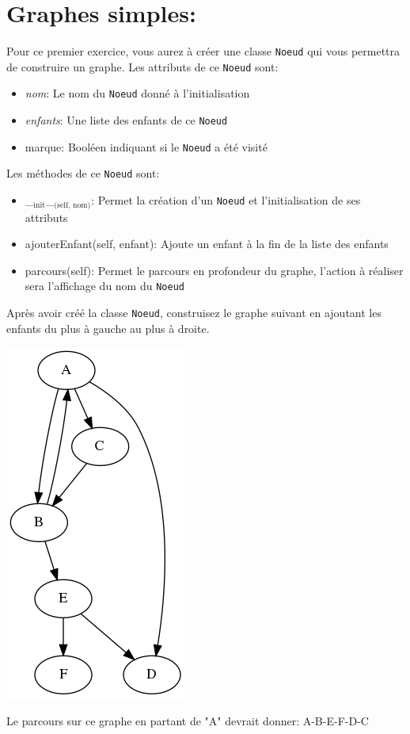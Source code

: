 \documentclass{article}
\begin{document}
\clearpage
\section{Graphes simples:}
\label{sec-3}
Pour ce premier exercice, vous aurez à créer une classe \verb~Noeud~ qui vous permettra de construire un graphe.
Les attributs de ce \verb~Noeud~ sont:
\begin{itemize}
\item \emph{nom}: Le nom du \verb~Noeud~ donné à l'initialisation
\item \emph{enfants}: Une liste des enfants de ce \verb~Noeud~
\item marque: Booléen indiquant si le \verb~Noeud~ a été visité
\end{itemize}

\noindent
Les méthodes de ce \verb~Noeud~ sont:
\begin{itemize}
\item \_$_{\text{init}}$\_$_{\text{(self, nom)}}$: Permet la création d'un \verb~Noeud~ et l'initialisation de ses attributs
\item ajouterEnfant(self, enfant): Ajoute un enfant à la fin de la liste des enfants
\item parcours(self): Permet le parcours en profondeur du graphe, l'action à réaliser sera l'affichage du nom du \verb~Noeud~
\end{itemize}

\noindent
Après avoir créé la classe \verb~Noeud~, construisez le graphe suivant en ajoutant les enfants du plus à gauche au plus à droite.

\begin{center}
\includegraphics[width=.25\linewidth]{./img/graphe.png}
\end{center}

\noindent
Le parcours sur ce graphe en partant de "A" devrait donner: A-B-E-F-D-C
\end{document}
